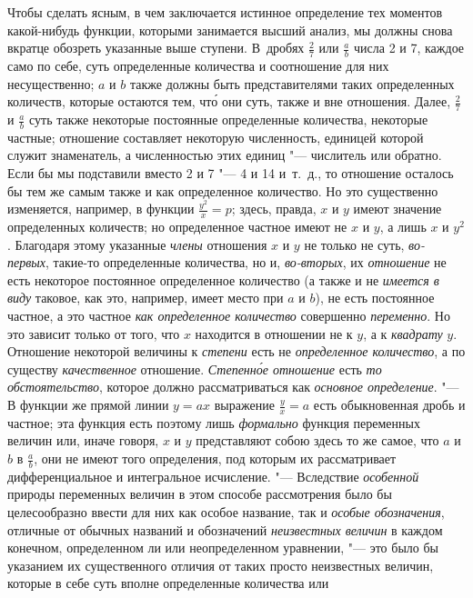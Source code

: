 Чтобы сделать ясным, в чем заключается истинное определение тех моментов
какой-нибудь функции, которыми занимается высший анализ, мы должны снова
вкратце обозреть указанные выше ступени. В~дробях $\frac 2 7$ или
$\frac a b$ числа 2 и 7, каждое само по себе, суть определенные
количества и соотношение для них несущественно; $a$ и
$b$ также должны быть представителями таких
определенных количеств, которые остаются тем, чт\'{о} они суть, также и вне
отношения. Далее, $\frac 2 7$ и $\frac a b$ суть также некоторые
постоянные определенные количества, некоторые частные; отношение составляет
некоторую численность, единицей которой служит знаменатель, а численностью
этих единиц "--- числитель или обратно. Если бы мы подставили вместо 2 и 7
"--- 4 и 14 и~т.~д., то отношение осталось бы тем же самым также и как
определенное количество. Но это существенно изменяется, например, в функции
$\frac{y^2} x=p$; здесь, правда, $x$ и
$y$ имеют значение определенных количеств; но
определенное частное имеют не $x$ и
$y$, а лишь $x$ и
$y^{2}$. Благодаря этому указанные
{\em члены} отношения $x$ и
$y$ не только не суть,
{\em во-первых}, такие-то определенные количества, но
и, {\em во-вторых}, их
{\em отношение} не есть некоторое постоянное
определенное количество (а также и не {\em имеется в
виду} таковое, как это, например, имеет место при
$a$ и $b$), не есть
постоянное частное, а это частное {\em как определенное
количество} совершенно {\em переменно}. Но это зависит
только от того, что $x$ находится в отношении не к
$y$, а к {\em квадрату}
$y$. Отношение некоторой величины к
{\em степени} есть не
{\em определенное количество}, а по существу
{\em качественное} отношение.
{\em Степенн\'{о}е отношение} есть
{\em то обстоятельство}, которое должно рассматриваться
как {\em основное определение}. "--- В функции же прямой
линии $y=ax$ выражение $\frac y x=a$ есть обыкновенная дробь и
частное; эта функция есть поэтому лишь {\em формально}
функция переменных величин или, иначе говоря, $x$ и
$y$ представляют собою здесь то же самое, что $a$ и $b$ в
$\frac a b$, они не имеют того определения, под которым их рассматривает
дифференциальное и интегральное исчисление. "--- Вследствие
{\em особенной} природы переменных величин в этом
способе рассмотрения было бы целесообразно ввести для них как особое
название, так и {\em особые обозначения}, отличные от
обычных названий и обозначений {\em неизвестных
величин} в каждом конечном, определенном ли или неопределенном уравнении, "---
это было бы указанием их существенного отличия от таких просто неизвестных
величин, которые в себе суть вполне определенные количества или
